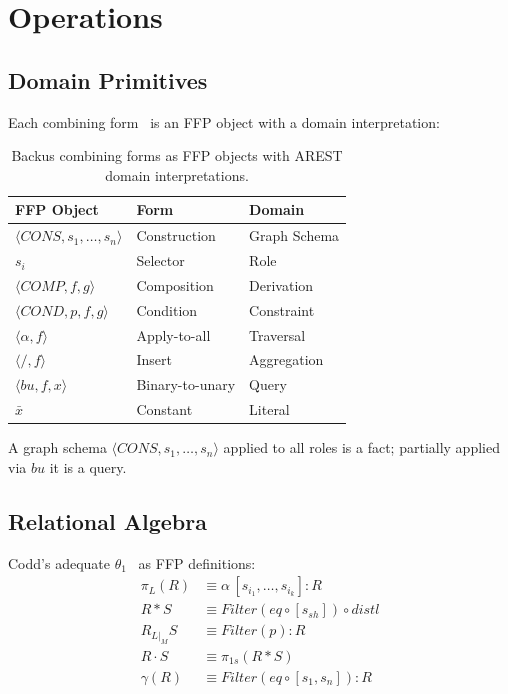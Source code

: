 \documentclass[acmsmall,screen,review]{acmart}
\begin{document}
\section{Operations}

\subsection{Domain Primitives}

Each combining form~\cite[Sec.\,11.2.4]{backus78} is an FFP object with a domain interpretation:

\begin{table}[h]
\caption{Backus combining forms as FFP objects with AREST domain interpretations.}
\label{tab:forms}
\centering
\small
\begin{tabular}{@{}lll@{}}
\toprule
\textbf{FFP Object} & \textbf{Form} & \textbf{Domain} \\
\midrule
$\langle\mathit{CONS}, s_1, \ldots, s_n\rangle$ & Construction & Graph Schema \\
$s_i$ & Selector & Role \\
$\langle\mathit{COMP}, f, g\rangle$ & Composition & Derivation \\
$\langle\mathit{COND}, p, f, g\rangle$ & Condition & Constraint \\
$\langle\alpha, f\rangle$ & Apply-to-all & Traversal \\
$\langle/, f\rangle$ & Insert & Aggregation \\
$\langle\mathit{bu}, f, x\rangle$ & Binary-to-unary & Query \\
$\bar{x}$ & Constant & Literal \\
\bottomrule
\end{tabular}
\end{table}

A graph schema $\langle\mathit{CONS}, s_1, \ldots, s_n\rangle$ applied to all roles is a fact; partially applied via $\mathit{bu}$ it is a query.

\subsection{Relational Algebra}

Codd's adequate $\theta_1$~\cite[Sec.\,2.2]{codd70} as FFP definitions:
\begin{align}
\pi_L(R) &\equiv \alpha\,[s_{i_1}, \ldots, s_{i_k}] : R \label{eq:proj} \\
R \mathbin{*} S &\equiv \mathit{Filter}(\mathit{eq} \circ [s_{\mathit{sh}}]) \circ \mathit{distl} \label{eq:join} \\
R_{L|_M}\!S &\equiv \mathit{Filter}(p) : R \label{eq:restrict} \\
R \cdot S &\equiv \pi_{1s}(R \mathbin{*} S) \label{eq:rcomp} \\
\gamma(R) &\equiv \mathit{Filter}(\mathit{eq} \circ [s_1, s_n]) : R \label{eq:tie}
\end{align}
\end{document}

